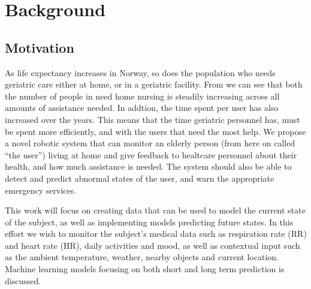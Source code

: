 \chapter{Background}

\section{Motivation}
As life expectancy increases in Norway, so does the population who needs geriatric care either at home, or in a geriatric facility. From \cite{webstat:oslo:hjsyk} we can see that both the number of people in need home nursing is steadily increasing across all amounts of assistance needed. In addtion, the time spent per user has also increased over the years. This means that the time geriatric personnel has, must be spent more efficiently, and with the users that need the most help. We propose a novel robotic system that can monitor an elderly person (from here on called ``the user'') living at home and give feedback to healtcare personnel about their health, and how much assistance is needed. The system should also be able to detect and predict abnormal states of the user, and warn the appropriate emergency services.

This work will focus on creating data that can be used to model the current state of the subject, as well as implementing models predicting future states. In this effort we wish to monitor the subject's medical data such as respiration rate (RR) and heart rate (HR), daily activities and mood, as well as  contextual input such as the ambient temperature, weather, nearby objects and current location. Machine learning models focusing on both short and long term prediction is discussed. 











